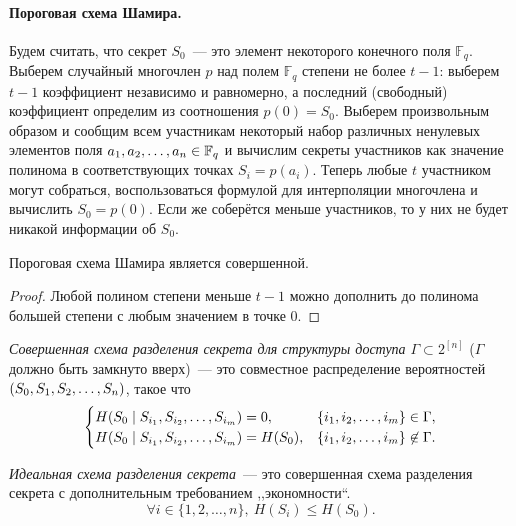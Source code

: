 \documentclass[12pt]{article}
\begin{document}
\paragraph{Пороговая схема Шамира.} Будем считать, что секрет $S_0$~--- это элемент некоторого конечного
поля $\mathbb{F}_q$. Выберем случайный многочлен $p$ над полем $\mathbb{F}_q$ степени не более
$t-1$: выберем $t-1$ коэффициент независимо и равномерно, а последний (свободный) коэффициент определим из
соотношения $p(0) = S_0$. Выберем произвольным образом и сообщим всем участникам некоторый
набор различных ненулевых элементов поля ${a}_1,{a}_2,\dotsc,{a}_{n}\in\mathbb{F}_q$ и вычислим секреты участников
как значение полинома в соответствующих точках $S_i = p(a_i)$. Теперь любые $t$ участником могут
собраться, воспользоваться формулой для интерполяции многочлена и вычислить $S_0=p(0)$. Если же
соберётся меньше участников, то у них не будет никакой информации об $S_0$.
\begin{statement}
    Пороговая схема Шамира является совершенной.
\end{statement}
\begin{proof}
    Любой полином степени меньше $t-1$ можно дополнить до полинома большей степени с любым значением в точке $0$.
\end{proof}

\begin{definition}
    \emph{Совершенная схема разделения секрета для структуры доступа $\Gamma\subset
    2^{[n]}$} ($\Gamma$ должно быть замкнуто вверх)~--- это совместное распределение вероятностей
    $(S_0,{S}_1,{S}_2,\dotsc,{S}_{n})$, такое что
    \[
    \begin{cases}
        H(S_0\mid{S}_{{i}_1},{S}_{{i}_2},\dotsc,{S}_{{i}_{m}}) = 0,      & \{{i}_1,{i}_2,\dotsc,{i}_{m}\}\in\Gamma,\\
        H(S_0\mid{S}_{{i}_1},{S}_{{i}_2},\dotsc,{S}_{{i}_{m}}) = H(S_0), & \{{i}_1,{i}_2,\dotsc,{i}_{m}\}\not\in\Gamma.
    \end{cases}
    \]
\end{definition}
\begin{definition}
    \emph{Идеальная схема разделения секрета}~--- это
    совершенная схема разделения секрета с дополнительным требованием ,,экономности``.
    \[
    \forall i\in\{1,2,\dotsc,n\},\ H(S_i)\le H(S_0).
    \]
\end{definition}
\end{document}
